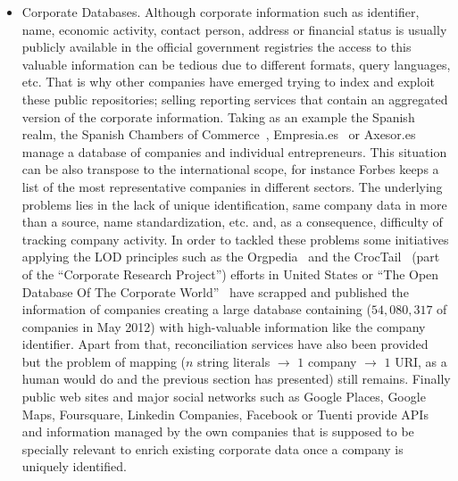 \documentclass{llncs}
\begin{document}
\begin{itemize}
 
 \item Corporate Databases. Although corporate information such as identifier, name, economic activity, contact person, address or 
 financial status is usually publicly available in the official government registries the access to this valuable information can be 
 tedious due to different formats, query languages, etc. That is why other companies have emerged trying to index and exploit 
 these public repositories; selling reporting services that contain an aggregated version of the corporate information. Taking as 
 an example the Spanish realm, the Spanish Chambers of Commerce~\cite{CamaraSpain}, Empresia.es~\cite{Empresia} or Axesor.es~\cite{Axexor} manage a database of companies and individual  entrepreneurs. This situation can be also transpose to the international scope, for instance Forbes keeps a list of 
 the most representative companies in different sectors. The underlying problems lies in the lack of unique identification, same company data in more 
 than a source, name standardization, etc. and, as a consequence, difficulty of tracking company activity. In order to tackled these problems some 
 initiatives applying the LOD principles such as the Orgpedia~\cite{Orgpedia} and the CrocTail~\cite{croctail} (part of the ``Corporate Research Project'') efforts in United States or 
 ``The Open Database Of The Corporate World''~\cite{Opencorporates} have scrapped and published the information 
 of companies creating a large database containing ($54,080,317$ of companies in May 2012) with high-valuable information like the company 
 identifier. Apart from that, reconciliation services have also been provided but the problem of mapping ($n$ string literals $\to$ $1$ company $\to$ $1$ URI, 
 as a human would do and the previous section has presented) still remains. Finally public web sites and major social networks such as Google 
 Places, Google Maps, Foursquare, Linkedin Companies, Facebook or Tuenti provide APIs and information managed by the own companies that is supposed 
 to be specially relevant to enrich existing corporate data once a company is uniquely identified.

 
\end{itemize}
\end{document}
